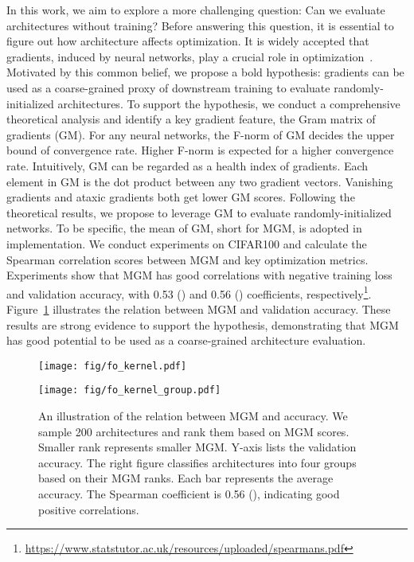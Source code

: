 In this work, we aim to explore a more challenging question: Can we evaluate architectures without training? 
Before answering this question, it is essential to figure out how architecture affects optimization. 
It is widely accepted that gradients, induced by neural networks, play a crucial role in optimization~\citep{DBLP:journals/tnn/BengioSF94,DBLP:journals/neco/HochreiterS97,DBLP:conf/icml/PascanuMB13}. Motivated by this common belief, we propose a bold hypothesis: gradients can be used as a coarse-grained proxy of downstream training to evaluate randomly-initialized architectures. To support the hypothesis, we conduct a comprehensive theoretical analysis and identify a key gradient feature, the Gram matrix of gradients (GM). For any neural networks, the F-norm of GM decides the upper bound of convergence rate. Higher F-norm is expected for a higher convergence rate.  Intuitively, GM can be regarded as a health index of gradients. Each element in GM is the dot product between any two gradient vectors. Vanishing gradients and ataxic gradients both get lower GM scores. Following the theoretical results, we propose to leverage GM  to evaluate randomly-initialized networks. To be specific, the mean of GM, short for MGM,  is adopted in implementation. We conduct experiments on CIFAR100 and calculate the Spearman correlation scores between MGM and key optimization metrics. Experiments show that MGM has good correlations with negative training loss and validation accuracy, with 0.53  () and 0.56  () coefficients, respectively\footnote{\url{https://www.statstutor.ac.uk/resources/uploaded/spearmans.pdf}}. Figure~\ref{fig:illu} illustrates the relation between MGM and validation accuracy. These results are strong evidence to support the hypothesis, demonstrating that MGM has good potential to be used as a coarse-grained architecture evaluation. 


\begin{figure}[t]
\centering
\begin{minipage}{.23\textwidth}
\centering
\texttt{[image: fig/fo\_kernel.pdf]}
\label{fig:prob1_6_2}
\end{minipage}
 \hfill
\begin{minipage}{0.23\textwidth}
\centering
\texttt{[image: fig/fo\_kernel\_group.pdf]}
\label{fig:prob1_6_1}
\end{minipage}
\caption{An illustration of the relation between MGM and accuracy. We sample 200 architectures and rank them based on MGM scores. Smaller rank represents smaller MGM. Y-axis lists the validation accuracy. The right figure classifies architectures into four groups based on their MGM ranks. Each bar represents the average accuracy. The Spearman coefficient is 0.56  (), indicating good positive correlations.  }
\label{fig:illu}
\end{figure}








